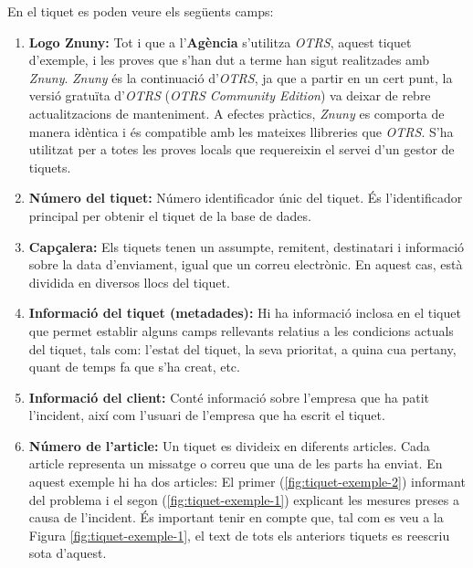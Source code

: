 En el tiquet es poden veure els següents camps:
\begin{enumerate}
    \item \textbf{Logo Znuny:} Tot i que a l'\textbf{Agència} s'utilitza \textit{OTRS}, aquest tiquet d'exemple, i les proves que s'han dut a terme han sigut realitzades amb \textit{Znuny}. \textit{Znuny} és la continuació d'\textit{OTRS}, ja que a partir en un cert punt, la versió gratuïta d'\textit{OTRS} (\textit{OTRS Community Edition}) va deixar de rebre actualitzacions de manteniment. A efectes pràctics, \textit{Znuny} es comporta de manera idèntica i és compatible amb les mateixes llibreries que \textit{OTRS}. S'ha utilitzat per a totes les proves locals que requereixin el servei d'un gestor de tiquets.
    \item \textbf{Número del tiquet:} Número identificador únic del tiquet. És l'identificador principal per obtenir el tiquet de la base de dades.
    \item \textbf{Capçalera:} Els tiquets tenen un assumpte, remitent, destinatari i informació sobre la data d'enviament, igual que un correu electrònic. En aquest cas, està dividida en diversos llocs del tiquet.
    \item \textbf{Informació del tiquet (metadades):} Hi ha informació inclosa en el tiquet que permet establir alguns camps rellevants relatius a les condicions actuals del tiquet, tals com: l'estat del tiquet, la seva prioritat, a quina cua pertany, quant de temps fa que s'ha creat, etc.
    \item \textbf{Informació del client:} Conté informació sobre l'empresa que ha patit l'incident, així com l'usuari de l'empresa que ha escrit el tiquet.
    \item \textbf{Número de l'article:} Un tiquet es divideix en diferents articles. Cada article representa un missatge o correu que una de les parts ha enviat. En aquest exemple hi ha dos articles: El primer (\ref{fig:tiquet-exemple-2}) informant del problema i el segon (\ref{fig:tiquet-exemple-1}) explicant les mesures preses a causa de l'incident. És important tenir en compte que, tal com es veu a la Figura \ref{fig:tiquet-exemple-1}, el text de tots els anteriors tiquets es reescriu sota d'aquest.
\end{enumerate}

